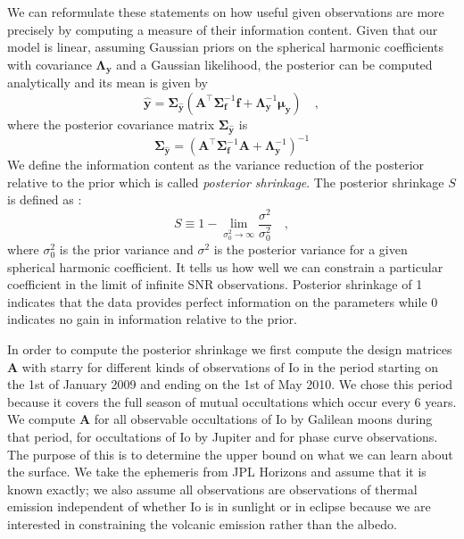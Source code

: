 \documentclass[linenumbers,modern]{aastex62}
\begin{document}
We can reformulate these statements on how useful given observations are more precisely by computing a measure of their information content.
Given that our model is linear, assuming Gaussian priors on the spherical harmonic coefficients with covariance $\boldsymbol{\Lambda}_\mathbf{y}$ and a Gaussian likelihood, the posterior can be computed analytically and its mean is given by
\begin{equation}
    \widehat{\mathbf{y}}=\boldsymbol{\Sigma}_{\hat{\mathbf{y}}}\left(\mathbf{A}^{\top} \boldsymbol{\Sigma}_{\mathbf{f}}^{-1} \mathbf{f}+\boldsymbol{\Lambda}_{\mathbf{y}}^{-1} \boldsymbol{\mu}_{\mathbf{y}}\right)
    \quad,
    \label{eq:linear_solve_mean}
\end{equation}
where the posterior covariance matrix $\boldsymbol{\Sigma}_{\hat{\mathbf{y}}}$ is 
\begin{equation}
\boldsymbol{\Sigma}_{\hat{\mathbf{y}}}=\left( \mathbf{A}^{\top} \boldsymbol{\Sigma}_{\mathbf{f}}^{-1} \mathbf{A} +\boldsymbol{\Lambda}_{\mathbf{y}}^{-1}\right)^{-1}
    \label{eq:linear_solve_cov}
\end{equation}
We define the information content as the variance reduction of the posterior relative to the prior which is called \emph{posterior shrinkage}.
The posterior shrinkage $S$ is defined as \citep{luger2021a,betancourt2018}:
\begin{equation}
S \equiv 1-\lim _{\sigma_{0}^{2} \rightarrow \infty} \frac{\sigma^{2}}{\sigma_{0}^{2}}
    \quad,
\end{equation}
where $\sigma^2_0$ is the prior variance and $\sigma^2$ is the posterior variance for a given spherical harmonic coefficient.
It tells us how well we can constrain a particular coefficient in the limit of infinite SNR observations.
Posterior shrinkage of 1 indicates that the data provides perfect information on the parameters while 0 indicates no gain in information relative to the prior.

In order to compute the posterior shrinkage we first compute the design matrices $\mathbf{A}$ with \textsf{starry} for different kinds of observations of Io in the period starting on the 1st of January 2009 and ending on the 1st of May 2010.
We chose this period because it covers the full season of mutual occultations which occur every 6 years.
We compute $\mathbf{A}$ for all observable occultations of Io by Galilean moons during that period, for occultations of Io by Jupiter and for phase curve observations.
The purpose of this is to determine the upper bound on what we can learn about the surface. 
We take the ephemeris from \textsf{JPL Horizons} and assume that it is known exactly; we also assume all observations are observations of thermal emission independent of whether Io is in sunlight or in eclipse because we are interested in constraining the volcanic emission rather than the albedo.
\end{document}
